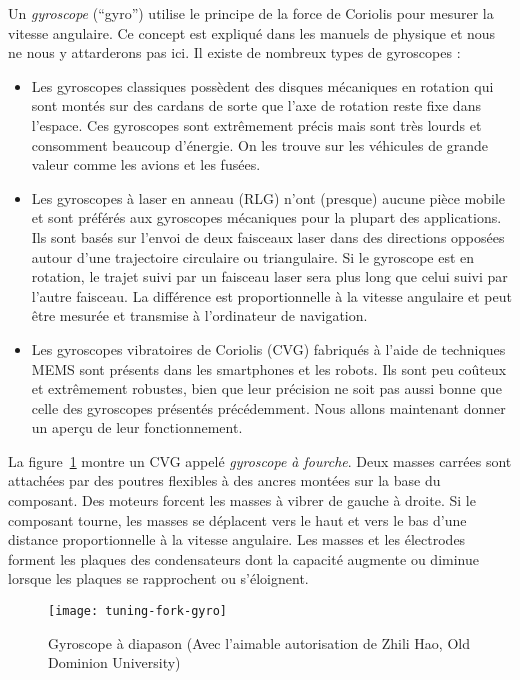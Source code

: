 {Un \emph{gyroscope} (``gyro'') utilise le principe de la force de Coriolis pour mesurer la vitesse angulaire. Ce concept est expliqué dans les manuels de physique et nous ne nous y attarderons pas ici. Il existe de nombreux types de gyroscopes :
\begin{itemize}
\item Les gyroscopes classiques possèdent des disques mécaniques en rotation qui sont montés sur des cardans de sorte que l'axe de rotation reste fixe dans l'espace. Ces gyroscopes sont extrêmement précis mais sont très lourds et consomment beaucoup d'énergie. On les trouve sur les véhicules de grande valeur comme les avions et les fusées.
\item Les gyroscopes à laser en anneau (RLG) n'ont (presque) aucune pièce mobile et sont préférés aux gyroscopes mécaniques pour la plupart des applications. Ils sont basés sur l'envoi de deux faisceaux laser dans des directions opposées autour d'une trajectoire circulaire ou triangulaire. Si le gyroscope est en rotation, le trajet suivi par un faisceau laser sera plus long que celui suivi par l'autre faisceau. La différence est proportionnelle à la vitesse angulaire et peut être mesurée et transmise à l'ordinateur de navigation.
\item Les gyroscopes vibratoires de Coriolis (CVG) fabriqués à l'aide de techniques MEMS sont présents dans les smartphones et les robots. Ils sont peu coûteux et extrêmement robustes, bien que leur précision ne soit pas aussi bonne que celle des gyroscopes présentés précédemment. Nous allons maintenant donner un aperçu de leur fonctionnement.
\end{itemize}

La figure~\ref{fig.tuning-gyro-image} montre un CVG appelé \emph{gyroscope à fourche}. Deux masses carrées sont attachées par des poutres flexibles à des ancres montées sur la base du composant. Des moteurs forcent les masses à vibrer de gauche à droite. Si le composant tourne, les masses se déplacent vers le haut et vers le bas d'une distance proportionnelle à la vitesse angulaire. Les masses et les électrodes forment les plaques des condensateurs dont la capacité augmente ou diminue lorsque les plaques se rapprochent ou s'éloignent.

\begin{figure}
\begin{center}
\texttt{[image: tuning-fork-gyro]}
\end{center}
\caption{Gyroscope à diapason (Avec l'aimable autorisation de Zhili Hao, Old Dominion University)}\label{fig.tuning-gyro-image}
\end{figure}

}
